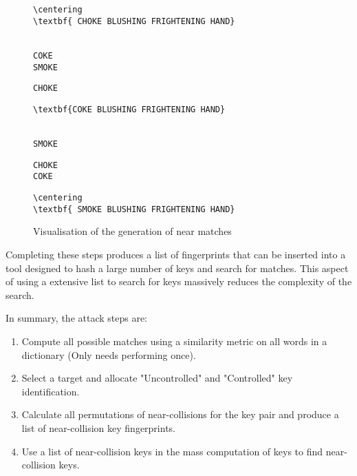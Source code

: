 \begin{figure}[h!]
    \centering
    \begin{BVerbatim}[commandchars=\\\{\}]
        \centering
\textbf{ CHOKE BLUSHING FRIGHTENING HAND}
    \end{BVerbatim}
    \\
    \verb|COKE                           |
    \\
    \verb|SMOKE                          |
    \\
    \hspace{1cm}



    \verb|CHOKE                          |
    \\
    \begin{BVerbatim}[commandchars=\\\{\}]
\textbf{COKE BLUSHING FRIGHTENING HAND}
    \end{BVerbatim}
    \\
    \verb|SMOKE                          |
    \\
    \hspace{1cm}


    \verb|CHOKE                          |
    \\
    \verb|COKE                           |
    \\
    \begin{BVerbatim}[commandchars=\\\{\}]
        \centering
\textbf{ SMOKE BLUSHING FRIGHTENING HAND}
    \end{BVerbatim}
    \caption{Visualisation of the generation of near matches}
    \label{fig:nearMatch}
\end{figure}

Completing these steps produces a list of fingerprints that can be inserted into a tool designed to hash a large number of keys and search for matches. This aspect of using a extensive list to search for keys massively reduces the complexity of the search.

In summary, the attack steps are:

\begin{enumerate}
    \item Compute all possible matches using a similarity metric on all words in a dictionary (Only needs performing once).

    \item Select a target and allocate "Uncontrolled" and "Controlled" key identification.
    
    \item Calculate all permutations of near-collisions for the key pair and produce a list of near-collision key fingerprints.
    
    \item Use a list of near-collision keys in the mass computation of keys to find near-collision keys.

\end{enumerate}

